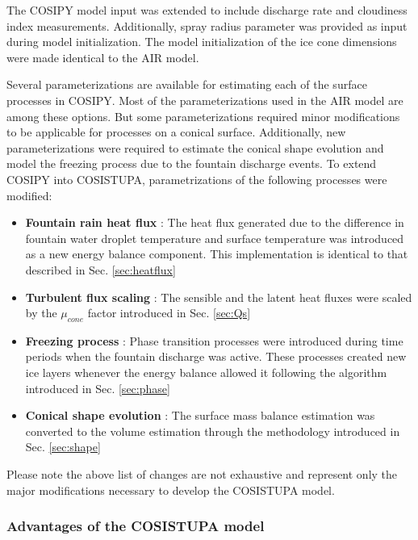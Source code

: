 The COSIPY model input was extended to include discharge rate and cloudiness index measurements. Additionally,
spray radius parameter was provided as input during model initialization. The model initialization of the ice
cone dimensions were made identical to the AIR model. 

Several parameterizations are available for estimating each of the surface processes in COSIPY. Most of the
parameterizations used in the AIR model are among these options. But some parameterizations required minor
modifications to be applicable for processes on a conical surface. Additionally, new parameterizations were
required to estimate the conical shape evolution and model the freezing process due to the fountain discharge
events. To extend COSIPY into COSISTUPA, parametrizations of the following processes were modified:

\begin{itemize}

  \item \textbf{Fountain rain heat flux} : The heat flux generated due to the difference in fountain water droplet
    temperature and surface temperature was introduced as a new energy balance component. This implementation is
    identical to that described in Sec. \ref{sec:heatflux}

  \item \textbf{Turbulent flux scaling} : The sensible and the latent heat fluxes were scaled by the $\mu_{cone}$ factor
    introduced in Sec. \ref{sec:Qs}

  \item \textbf{Freezing process} : Phase transition processes were introduced during time periods when the fountain
    discharge was active. These processes created new ice layers whenever the energy balance allowed it
    following the algorithm introduced in Sec. \ref{sec:phase}

  \item \textbf{Conical shape evolution} : The surface mass balance estimation was converted to the volume estimation
    through the methodology introduced in Sec. \ref{sec:shape}

\end{itemize}

Please note the above list of changes are not exhaustive and represent only the major modifications necessary to
develop the COSISTUPA model.

\subsubsection{Advantages of the COSISTUPA model}

